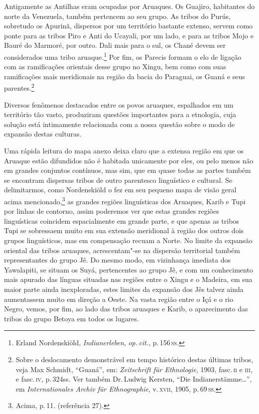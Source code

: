 Antigamente as Antilhas eram ocupadas
por Aruaques. Os Guajiro, habitantes do norte da Venezuela, também
pertencem ao seu grupo. As tribos do Purús, sobretudo os Apurinã,
dispersos por um território bastante extenso, servem como ponte para as
tribos Piro e Anti do Ucayali, por um lado, e para as tribos Mojo e
Bauré do Marmoré, por outro. Dali mais para o sul, os Chané devem ser
considerados uma tribo aruaque.\footnote{Erland Nordenskiöld,
  \textit{Indianerleben}, \textit{op.\,cit.}, p.\,156\,\textsc{ss}.} Por fim, os Parecis formam o elo de ligação com as
ramificações orientais desse grupo no Xingu, bem como com suas
ramificações mais meridionais na região da bacia do Paraguai, os Guaná e
seus parentes.\footnote{Sobre o deslocamento demonstrável em tempo
  histórico destas últimas tribos, veja Max Schmidt, ``Guaná'', em:
  \textit{Zeitschrift für Ethnologie}, 1903, fasc.\,\textsc{ii} e \textsc{iii}, e fasc.\,\textsc{iv}, p.\,324ss. Ver também Dr.\,Ludwig Kersten, ``Die Indianerstämme\ldots'', em
  \textit{Internationales Archiv für Ethnographie}, v.\,\textsc{xvii}, 1905, p.\,69\,\textsc{ss}.}

Diversos fenômenos destacados entre os povos aruaques, espalhados em um
território tão vasto, produziram questões importantes para a etnologia,
cuja solução está intimamente relacionada com a nossa questão sobre o
modo de expansão destas culturas.

Uma rápida leitura do mapa anexo deixa claro que a extensa região em
que os Aruaque estão difundidos não é habitada unicamente por eles, ou
pelo menos não em grandes conjuntos contínuos, mas sim, que em quase
todas as partes também se encontram dispersas tribos de outro
parentesco linguístico e cultural. Se delimitarmos, como Nordenskiöld o
fez em seu pequeno mapa de visão geral acima mencionado,\footnote{Acima,
  p.\,11. (referência 27).} as grandes regiões linguísticas dos Aruaques,
Karib e Tupi por linhas de contorno, assim poderemos ver que estas
grandes regiões linguísticas coincidem espacialmente em grande parte, e
que apenas as tribos Tupi se sobressaem muito em sua extensão meridional
à região dos outros dois grupos linguísticos, mas em compensação recuam
a Norte. No limite da expansão oriental das tribos aruaques,
acrescentam"-se na dispersão territorial também representantes do grupo
Jê. Do mesmo modo, em vizinhança imediata dos Yawalapiti, se situam os Suyá,
pertencentes ao grupo Jê, e com um conhecimento mais apurado das línguas
situadas nas regiões entre o Xingu e o Madeira, em sua maior parte ainda
inexploradas, estes limites da expansão dos Jês talvez ainda aumentassem
muito em direção a Oeste. Na vasta região entre o Içá e o rio Negro,
vemos, por fim, ao lado das tribos aruaques e Karib, o aparecimento das
tribos do grupo Betoya em todos os lugares.

